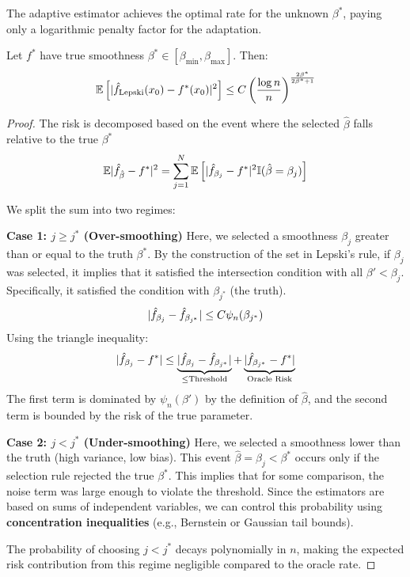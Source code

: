 The adaptive estimator achieves the optimal rate for the unknown $\beta^*$, paying only a logarithmic penalty factor for the adaptation.

\begin{thm}
Let $f^*$ have true smoothness $\beta^* \in [\beta_{\min}, \beta_{\max}]$. Then:
\[
\mathbb{E} \left[ \lvert\hat{f}_{\text{Lepski}}(x_0) - f^*(x_0)\rvert^2 \right] \leq C \left( \frac{\log n}{n} \right)^{\frac{2\beta^*}{2\beta^*+1}}
\]
\end{thm}

\begin{proof}
    The risk is decomposed based on the event where the selected $\hat{\beta}$ falls relative to the true $\beta^*$
\[
\mathbb{E} \lvert\hat{f}_{\hat{\beta}} - f^*\rvert^2 = \sum_{j=1}^N \mathbb{E} \left[ \lvert\hat{f}_{\beta_j} - f^*\rvert^2 \mathbb{I}(\hat{\beta} = \beta_j) \right]
\]

We split the sum into two regimes:

\noindent\textbf{Case 1: $j \geq j^*$ (Over-smoothing)}
Here, we selected a smoothness $\beta_j$ greater than or equal to the truth $\beta^*$. By the construction of the set in Lepski's rule, if $\beta_j$ was selected, it implies that it satisfied the intersection condition with all $\beta' < \beta_j$. Specifically, it satisfied the condition with $\beta_{j^*}$ (the truth).
\[
\lvert\hat{f}_{\beta_j} - \hat{f}_{\beta_{j^*}}\rvert \leq C \psi_n(\beta_{j^*})
\]
Using the triangle inequality:
\[
\lvert\hat{f}_{\beta_j} - f^*\rvert \leq \underbrace{\lvert\hat{f}_{\beta_j} - \hat{f}_{\beta_{j^*}}\rvert}_{\leq \text{Threshold}} + \underbrace{\lvert\hat{f}_{\beta_{j^*}} - f^*\rvert}_{\text{Oracle Risk}}
\]
The first term is dominated by $\psi_n(\beta')$ by the definition of $\hat \beta$, and the second term is bounded by the risk of the true parameter.

\textbf{Case 2: $j < j^*$ (Under-smoothing)}
Here, we selected a smoothness lower than the truth (high variance, low bias). This event $\hat{\beta} = \beta_j < \beta^*$ occurs only if the selection rule rejected the true $\beta^*$.
This implies that for some comparison, the noise term was large enough to violate the threshold. Since the estimators are based on sums of independent variables, we can control this probability using \textbf{concentration inequalities} (e.g., Bernstein or Gaussian tail bounds).

The probability of choosing $j < j^*$ decays polynomially in $n$, making the expected risk contribution from this regime negligible compared to the oracle rate.
\end{proof}
